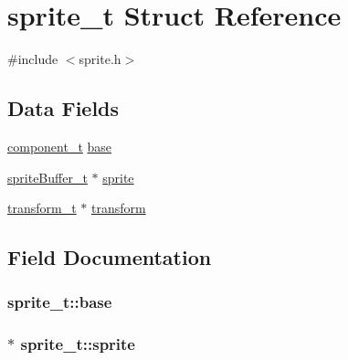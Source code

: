 \hypertarget{structsprite__t}{}\section{sprite\+\_\+t Struct Reference}
\label{structsprite__t}


{\ttfamily \#include $<$sprite.\+h$>$}

\subsection*{Data Fields}
\begin{DoxyCompactItemize}
\item 
\hyperlink{structcomponent__t}{component\+\_\+t} \hyperlink{structsprite__t_a64251931f050210a69a96ecf6738557b}{base}
\item 
\hyperlink{structsprite_buffer__t}{sprite\+Buffer\+\_\+t} $\ast$ \hyperlink{structsprite__t_a6aac03efd327d7ae0eda32e7aaa3083f}{sprite}
\item 
\hyperlink{structtransform__t}{transform\+\_\+t} $\ast$ \hyperlink{structsprite__t_a75832530a950033696778cb7f566b357}{transform}
\end{DoxyCompactItemize}


\subsection{Field Documentation}
\subsubsection[{\texorpdfstring{base}{base}}]{ sprite\+\_\+t\+::base}\hypertarget{structsprite__t_a64251931f050210a69a96ecf6738557b}{}\label{structsprite__t_a64251931f050210a69a96ecf6738557b}
\subsubsection[{\texorpdfstring{sprite}{sprite}}]{$\ast$ sprite\+\_\+t\+::sprite}\hypertarget{structsprite__t_a6aac03efd327d7ae0eda32e7aaa3083f}{}\label{structsprite__t_a6aac03efd327d7ae0eda32e7aaa3083f}
